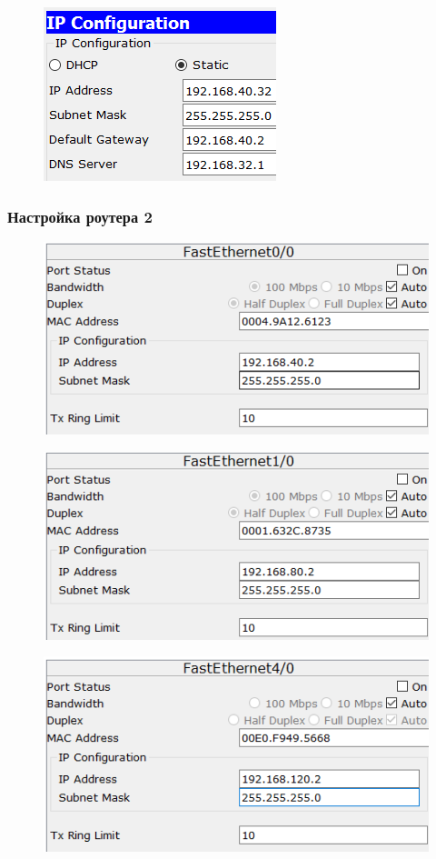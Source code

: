 \documentclass[14pt,a4paper,report]{report}
\begin{document}
\begin{figure}[h!]
	\centering
	\includegraphics[scale = 0.85]{images/3.png}
\end{figure}

\subsubsection{Настройка роутера 2}

\begin{figure}[h!]
	\centering
	\includegraphics[scale = 0.85]{images/4_1.png}
\end{figure}

\begin{figure}[h!]
	\centering
	\includegraphics[scale = 0.85]{images/4_2.png}
\end{figure}

\begin{figure}[h!]
	\centering
	\includegraphics[scale = 0.85]{images/4_3.png}
\end{figure}
\end{document}
